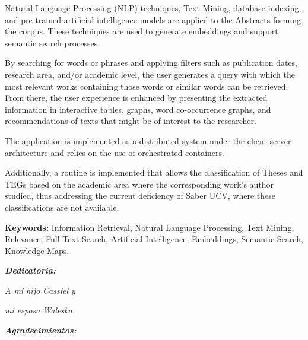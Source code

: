 \documentclass[
  10,
  openany]{book}
\begin{document}
Natural Language Processing (NLP) techniques, Text Mining, database indexing, and pre-trained artificial intelligence models are applied to the Abstracts forming the corpus. These techniques are used to generate embeddings and support semantic search processes.

By searching for words or phrases and applying filters such as publication dates, research area, and/or academic level, the user generates a query with which the most relevant works containing those words or similar words can be retrieved. From there, the user experience is enhanced by presenting the extracted information in interactive tables, graphs, word co-occurrence graphs, and recommendations of texts that might be of interest to the researcher.

The application is implemented as a distributed system under the client-server architecture and relies on the use of orchestrated containers.

Additionally, a routine is implemented that allows the classification of Theses and TEGs based on the academic area where the corresponding work's author studied, thus addressing the current deficiency of Saber UCV, where these classifications are not available.

\vspace*{2cm}

\textbf{Keywords:} Information Retrieval, Natural Language Processing, Text Mining, Relevance, Full Text Search, Artificial Intelligence, Embeddings, Semantic Search, Knowledge Maps.


\thispagestyle{empty}




\setlength{\abovedisplayskip}{-5pt}
\setlength{\abovedisplayshortskip}{-5pt}
\thispagestyle{empty}

\newpage
\begin{center}
\large{\textbf{\emph{\Huge{Dedicatoria:}}}}
\end{center}
\thispagestyle{empty}
\vspace*{5cm}
\thispagestyle{empty}
\begin{center} \Large \emph{A  mi hijo Cassiel y  } \end{center}
\vspace*{1cm}
\begin{center} \Large \emph{mi esposa Waleska.} \end{center}



\newpage
\begin{center}
\large{\textbf{\emph{\Huge{Agradecimientos:}}}}
\end{center}
\thispagestyle{empty}
\vspace*{2cm}
\thispagestyle{empty}
\end{document}
